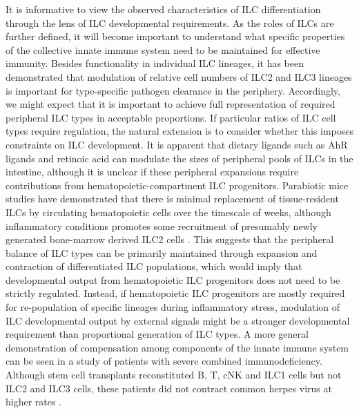 It is informative to view the observed characteristics of ILC differentiation through the lens of ILC developmental requirements. As the roles of ILCs are further defined, it will become important to understand what specific properties of the collective innate immune system need to be maintained for effective immunity. Besides functionality in individual ILC lineages, it has been demonstrated that modulation of relative cell numbers of ILC2 and ILC3 lineages is important for type-specific pathogen clearance in the periphery. Accordingly, we might expect that it is important to achieve full representation of required peripheral ILC types in acceptable proportions. If particular ratios of ILC cell types require regulation, the natural extension is to consider whether this imposes constraints on ILC development. It is apparent that dietary ligands such as AhR ligands and retinoic acid can modulate the sizes of peripheral pools of ILCs in the intestine, although it is unclear if these peripheral expansions require contributions from hematopoietic-compartment ILC progenitors. Parabiotic mice studies have demonstrated that there is minimal replacement of tissue-resident ILCs by circulating hematopoietic cells over the timescale of weeks, although inflammatory conditions promotes some recruitment of presumably newly generated bone-marrow derived ILC2 cells \cite{Gasteiger2015}. This suggests that the peripheral balance of ILC types can be primarily maintained through expansion and contraction of differentiated ILC populations, which would imply that developmental output from hematopoietic ILC progenitors does not need to be strictly regulated. Instead, if hematopoietic ILC progenitors are mostly required for re-population of specific lineages during inflammatory stress, modulation of ILC developmental output by external signals might be a stronger developmental requirement than proportional generation of ILC types. A more general demonstration of compensation among components of the innate immune system can be seen in a study of patients with severe combined immunodeficiency. Although stem cell transplants reconstituted B, T, cNK and ILC1 cells but not ILC2 and ILC3 cells, these patients did not contract common herpes virus at higher rates \cite{vely2016}.

